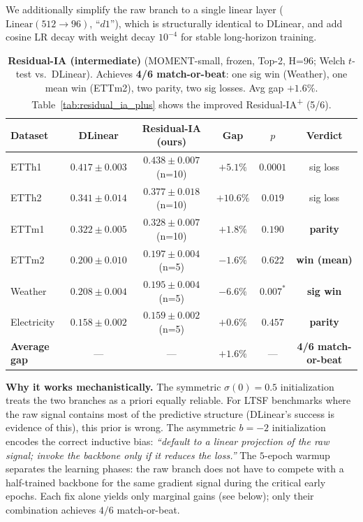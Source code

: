 \documentclass{article}
\begin{document}
We additionally simplify the raw branch to a single linear layer ($\text{Linear}(512{\to}96)$, ``$d1$''), which is structurally identical to DLinear, and add cosine LR decay with weight decay $10^{-4}$ for stable long-horizon training.

\begin{table}[!htbp]
\centering
\caption{\textbf{Residual-IA (intermediate)} (MOMENT-small, frozen, Top-2, H=96; Welch $t$-test vs.\ DLinear). Achieves \textbf{4/6 match-or-beat}: one sig win (Weather), one mean win (ETTm2), two parity, two sig losses. Avg gap $+1.6\%$. Table~\ref{tab:residual_ia_plus} shows the improved Residual-IA\textsuperscript{+} (5/6).}
\label{tab:residual_ia}
\small
\begin{tabular}{@{}lccccc@{}}
\toprule
Dataset & DLinear & Residual-IA (ours) & Gap & $p$ & Verdict \\
\midrule
ETTh1        & $0.417 \pm 0.003$ & $0.438 \pm 0.007$ {\scriptsize(n=10)} & $+5.1\%$ & $0.0001$ & sig loss \\
ETTh2        & $0.341 \pm 0.014$ & $0.377 \pm 0.018$ {\scriptsize(n=10)} & $+10.6\%$ & $0.019$ & sig loss \\
ETTm1        & $0.322 \pm 0.005$ & $0.328 \pm 0.007$ {\scriptsize(n=10)} & $+1.8\%$ & $0.190$ & \textbf{parity} \\
ETTm2        & $0.200 \pm 0.010$ & $\mathbf{0.197 \pm 0.004}$ {\scriptsize(n=5)} & $-1.6\%$ & $0.622$ & \textbf{win (mean)} \\
Weather      & $0.208 \pm 0.004$ & $\mathbf{0.195 \pm 0.004}$ {\scriptsize(n=5)} & $-6.6\%$ & $0.007^{\ast}$ & \textbf{sig win} \\
Electricity  & $0.158 \pm 0.002$ & $0.159 \pm 0.002$ {\scriptsize(n=5)} & $+0.6\%$ & $0.457$ & \textbf{parity} \\
\midrule
\textbf{Average gap}          & --- & --- & $\mathbf{+1.6\%}$ & --- & \textbf{4/6 match-or-beat} \\
\bottomrule
\end{tabular}
\end{table}

\textbf{Why it works mechanistically.} The symmetric $\sigma(0){=}0.5$ initialization treats the two branches as a priori equally reliable. For LTSF benchmarks where the raw signal contains most of the predictive structure (DLinear's success is evidence of this), this prior is wrong. The asymmetric $b{=}{-}2$ initialization encodes the correct inductive bias: \emph{``default to a linear projection of the raw signal; invoke the backbone only if it reduces the loss.''} The $5$-epoch warmup separates the learning phases: the raw branch does not have to compete with a half-trained backbone for the same gradient signal during the critical early epochs. Each fix alone yields only marginal gains (see below); only their combination achieves $4/6$ match-or-beat.
\end{document}
